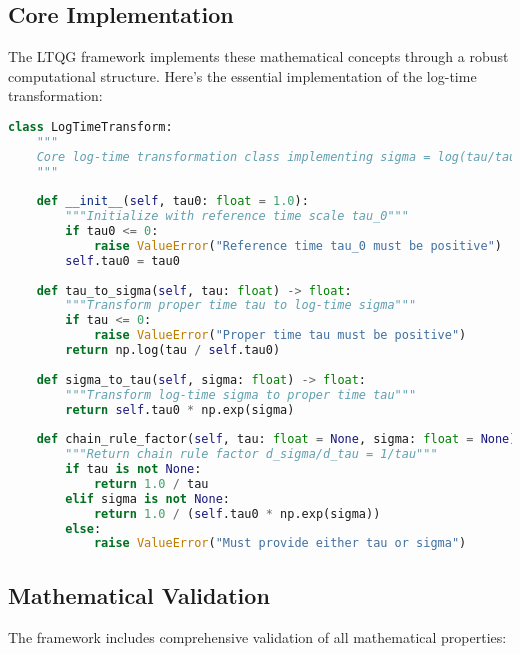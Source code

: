 \documentclass[11pt,a4paper]{article}
\begin{document}
\subsection{Core Implementation}

The LTQG framework implements these mathematical concepts through a robust computational structure. Here's the essential implementation of the log-time transformation:

\begin{lstlisting}[language=Python, caption=Core Log-Time Transformation Implementation]
class LogTimeTransform:
    """
    Core log-time transformation class implementing sigma = log(tau/tau_0)
    """
    
    def __init__(self, tau0: float = 1.0):
        """Initialize with reference time scale tau_0"""
        if tau0 <= 0:
            raise ValueError("Reference time tau_0 must be positive")
        self.tau0 = tau0
    
    def tau_to_sigma(self, tau: float) -> float:
        """Transform proper time tau to log-time sigma"""
        if tau <= 0:
            raise ValueError("Proper time tau must be positive")
        return np.log(tau / self.tau0)
    
    def sigma_to_tau(self, sigma: float) -> float:
        """Transform log-time sigma to proper time tau"""
        return self.tau0 * np.exp(sigma)
    
    def chain_rule_factor(self, tau: float = None, sigma: float = None) -> float:
        """Return chain rule factor d_sigma/d_tau = 1/tau"""
        if tau is not None:
            return 1.0 / tau
        elif sigma is not None:
            return 1.0 / (self.tau0 * np.exp(sigma))
        else:
            raise ValueError("Must provide either tau or sigma")
\end{lstlisting}

\subsection{Mathematical Validation}

The framework includes comprehensive validation of all mathematical properties:
\end{document}
